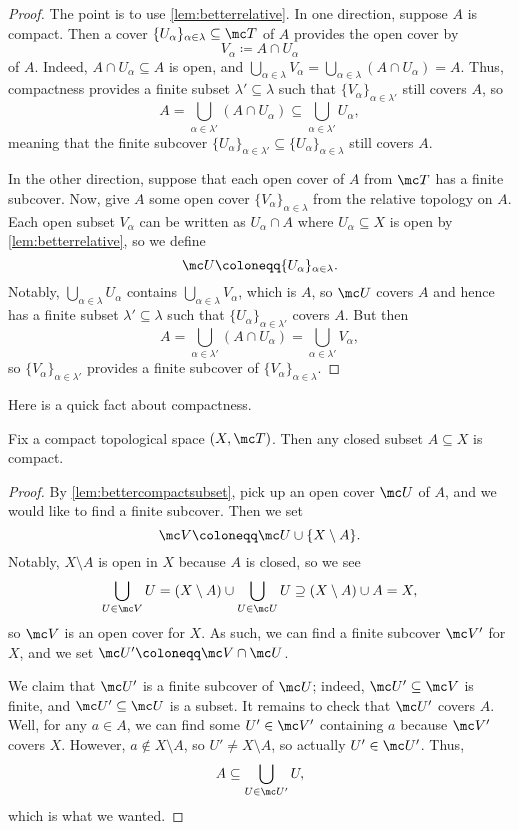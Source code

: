 \documentclass[../notes.tex]{subfiles}
\begin{document}
\begin{proof}
	The point is to use \autoref{lem:betterrelative}. In one direction, suppose $A$ is compact. Then a cover $\{U_\alpha\}_{\alpha\in\lambda}\subseteq\mc T$ of $A$ provides the open cover by
	\[V_\alpha\coloneqq A\cap U_\alpha\]
	of $A$. Indeed, $A\cap U_\alpha\subseteq A$ is open, and $\bigcup_{\alpha\in\lambda}V_\alpha=\bigcup_{\alpha\in\lambda}(A\cap U_\alpha)=A$. Thus, compactness provides a finite subset $\lambda'\subseteq\lambda$ such that $\{V_\alpha\}_{\alpha\in\lambda'}$ still covers $A$, so
	\[A=\bigcup_{\alpha\in\lambda'}(A\cap U_\alpha)\subseteq\bigcup_{\alpha\in\lambda'}U_\alpha,\]
	meaning that the finite subcover $\{U_\alpha\}_{\alpha\in\lambda'}\subseteq\{U_\alpha\}_{\alpha\in\lambda}$ still covers $A$.
	
	In the other direction, suppose that each open cover of $A$ from $\mc T$ has a finite subcover. Now, give $A$ some open cover $\{V_\alpha\}_{\alpha\in\lambda}$ from the relative topology on $A$. Each open subset $V_\alpha$ can be written as $U_\alpha\cap A$ where $U_\alpha\subseteq X$ is open by \autoref{lem:betterrelative}, so we define
	\[\mc U\coloneqq\{U_\alpha\}_{\alpha\in\lambda}.\]
	Notably, $\bigcup_{\alpha\in\lambda}U_\alpha$ contains $\bigcup_{\alpha\in\lambda}V_\alpha$, which is $A$, so $\mc U$ covers $A$ and hence has a finite subset $\lambda'\subseteq\lambda$ such that $\{U_\alpha\}_{\alpha\in\lambda'}$ covers $A$. But then
	\[A=\bigcup_{\alpha\in\lambda'}(A\cap U_\alpha)=\bigcup_{\alpha\in\lambda'}V_\alpha,\]
	so $\{V_\alpha\}_{\alpha\in\lambda'}$ provides a finite subcover of $\{V_\alpha\}_{\alpha\in\lambda}$.
\end{proof}
Here is a quick fact about compactness.
\begin{lemma}
	Fix a compact topological space $(X,\mc T)$. Then any closed subset $A\subseteq X$ is compact.
\end{lemma}
\begin{proof}
	By \autoref{lem:bettercompactsubset}, pick up an open cover $\mc U$ of $A$, and we would like to find a finite subcover. Then we set
	\[\mc V\coloneqq\mc U\cup\{X\setminus A\}.\]
	Notably, $X\setminus A$ is open in $X$ because $A$ is closed, so we see
	\[\bigcup_{U\in\mc V}U=(X\setminus A)\cup\bigcup_{U\in\mc U}U\supseteq(X\setminus A)\cup A=X,\]
	so $\mc V$ is an open cover for $X$. As such, we can find a finite subcover $\mc V'$ for $X$, and we set $\mc U'\coloneqq\mc V\cap\mc U$.
	
	We claim that $\mc U'$ is a finite subcover of $\mc U$; indeed, $\mc U'\subseteq\mc V$ is finite, and $\mc U'\subseteq\mc U$ is a subset. It remains to check that $\mc U'$ covers $A$. Well, for any $a\in A$, we can find some $U'\in\mc V'$ containing $a$ because $\mc V'$ covers $X$. However, $a\notin X\setminus A$, so $U'\ne X\setminus A$, so actually $U'\in\mc U'$. Thus,
	\[A\subseteq\bigcup_{U\in\mc U'}U,\]
	which is what we wanted.
\end{proof}
\end{document}
